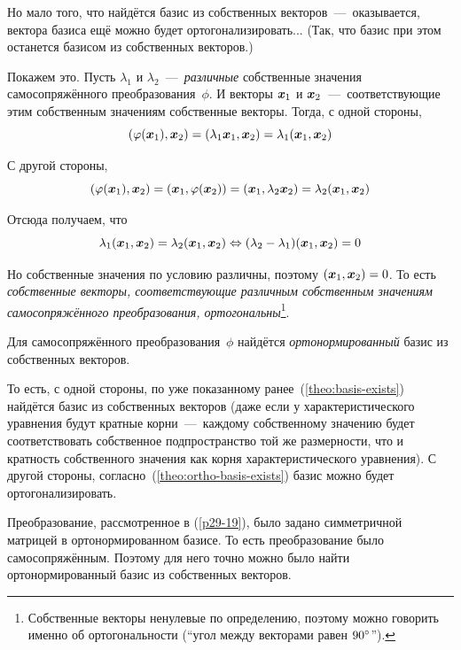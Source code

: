 \documentclass[a4paper,12pt]{article}
\theoremstyle{remark}
\begin{document}
  \bigskip
  
  Но мало того, что найдётся базис из собственных векторов~---~оказывается, вектора базиса ещё можно будет ортогонализировать...
  (Так, что базис при этом останется базисом из собственных векторов.)
  
  Покажем это.
  Пусть $\lambda_1$ и $\lambda_2$~---~\emph{различные} собственные значения самосопряжённого преобразования~$\phi$.
  И векторы $\boldsymbol x_1$ и $\boldsymbol x_2$~---~соответствующие этим собственным значениям собственные векторы.
  Тогда, с одной стороны,
  \[
    (\varphi(\boldsymbol x_1), \boldsymbol x_2) = (\lambda_1 \boldsymbol x_1, \boldsymbol x_2) = \lambda_1 (\boldsymbol x_1, \boldsymbol x_2)
  \]
  
  С другой стороны,
  \[
    (\varphi(\boldsymbol x_1), \boldsymbol x_2) = (\boldsymbol x_1, \varphi(\boldsymbol x_2)) = (\boldsymbol x_1, \lambda_2 \boldsymbol x_2) = \lambda_2 (\boldsymbol x_1, \boldsymbol x_2)
  \]
  
  Отсюда получаем, что
  \[
    \lambda_1 (\boldsymbol x_1, \boldsymbol x_2) = \lambda_2 (\boldsymbol x_1, \boldsymbol x_2) \Leftrightarrow (\lambda_2 - \lambda_1) (\boldsymbol x_1, \boldsymbol x_2) = 0
  \]
  
  Но собственные значения по условию различны, поэтому $(\bds x_1, \bds x_2) \hm= 0$.
  То есть \emph{собственные векторы, соответствующие различным собственным значениям самосопряжённого преобразования, ортогональны}\footnote{Собственные векторы ненулевые по определению, поэтому можно говорить именно об ортогональности (``угол между векторами равен $90\degree$'').}.
  
  \begin{theorem}\label{theo:ortho-basis-exists}
    Для самосопряжённого преобразования~$\phi$ найдётся \emph{ортонормированный} базис из собственных векторов.
  \end{theorem}
  
  То есть, с одной стороны, по уже показанному ранее~(\ref{theo:basis-exists}) найдётся базис из собственных векторов (даже если у характеристического уравнения будут кратные корни~---~каждому собственному значению будет соответствовать собственное подпространство той же размерности, что и кратность собственного значения как корня характеристического уравнения).
  С другой стороны, согласно~(\ref{theo:ortho-basis-exists}) базис можно будет ортогонализировать.
  
  \begin{eqexample}
    Преобразование, рассмотренное в (\ref{p29-19}), было задано симметричной матрицей в ортонормированном базисе.
    То есть преобразование было самосопряжённым.
    Поэтому для него точно можно было найти ортонормированный базис из собственных векторов.
  \end{eqexample}
  
\end{document}
